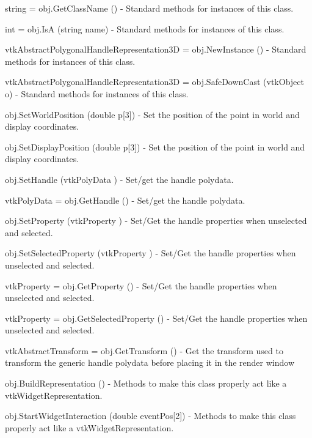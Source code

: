 \begin{DoxyItemize}
\item {\ttfamily string = obj.\-Get\-Class\-Name ()} -\/ Standard methods for instances of this class.  
\item {\ttfamily int = obj.\-Is\-A (string name)} -\/ Standard methods for instances of this class.  
\item {\ttfamily vtk\-Abstract\-Polygonal\-Handle\-Representation3\-D = obj.\-New\-Instance ()} -\/ Standard methods for instances of this class.  
\item {\ttfamily vtk\-Abstract\-Polygonal\-Handle\-Representation3\-D = obj.\-Safe\-Down\-Cast (vtk\-Object o)} -\/ Standard methods for instances of this class.  
\item {\ttfamily obj.\-Set\-World\-Position (double p\mbox{[}3\mbox{]})} -\/ Set the position of the point in world and display coordinates.  
\item {\ttfamily obj.\-Set\-Display\-Position (double p\mbox{[}3\mbox{]})} -\/ Set the position of the point in world and display coordinates.  
\item {\ttfamily obj.\-Set\-Handle (vtk\-Poly\-Data )} -\/ Set/get the handle polydata.  
\item {\ttfamily vtk\-Poly\-Data = obj.\-Get\-Handle ()} -\/ Set/get the handle polydata.  
\item {\ttfamily obj.\-Set\-Property (vtk\-Property )} -\/ Set/\-Get the handle properties when unselected and selected.  
\item {\ttfamily obj.\-Set\-Selected\-Property (vtk\-Property )} -\/ Set/\-Get the handle properties when unselected and selected.  
\item {\ttfamily vtk\-Property = obj.\-Get\-Property ()} -\/ Set/\-Get the handle properties when unselected and selected.  
\item {\ttfamily vtk\-Property = obj.\-Get\-Selected\-Property ()} -\/ Set/\-Get the handle properties when unselected and selected.  
\item {\ttfamily vtk\-Abstract\-Transform = obj.\-Get\-Transform ()} -\/ Get the transform used to transform the generic handle polydata before placing it in the render window  
\item {\ttfamily obj.\-Build\-Representation ()} -\/ Methods to make this class properly act like a vtk\-Widget\-Representation.  
\item {\ttfamily obj.\-Start\-Widget\-Interaction (double event\-Pos\mbox{[}2\mbox{]})} -\/ Methods to make this class properly act like a vtk\-Widget\-Representation.  

\end{DoxyItemize}
